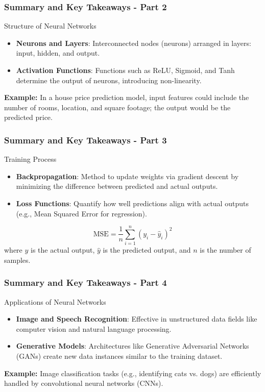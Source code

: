 \documentclass[aspectratio=169]{beamer}
\begin{document}
\begin{frame}[fragile]
  \frametitle{Summary and Key Takeaways - Part 2}
  \begin{block}{Structure of Neural Networks}
    \begin{itemize}
      \item \textbf{Neurons and Layers}: Interconnected nodes (neurons) arranged in layers: input, hidden, and output.
      \item \textbf{Activation Functions}: Functions such as ReLU, Sigmoid, and Tanh determine the output of neurons, introducing non-linearity.
    \end{itemize}
    
    \textbf{Example:} In a house price prediction model, input features could include the number of rooms, location, and square footage; the output would be the predicted price.
  \end{block}
\end{frame}

\begin{frame}[fragile]
  \frametitle{Summary and Key Takeaways - Part 3}
  \begin{block}{Training Process}
    \begin{itemize}
      \item \textbf{Backpropagation}: Method to update weights via gradient descent by minimizing the difference between predicted and actual outputs.
      \item \textbf{Loss Functions}: Quantify how well predictions align with actual outputs (e.g., Mean Squared Error for regression).
    \end{itemize}
    
    \begin{equation}
    \text{MSE} = \frac{1}{n} \sum_{i=1}^{n} (y_i - \hat{y}_i)^2
    \end{equation}
    where \(y\) is the actual output, \(\hat{y}\) is the predicted output, and \(n\) is the number of samples.
  \end{block}
\end{frame}

\begin{frame}[fragile]
  \frametitle{Summary and Key Takeaways - Part 4}
  \begin{block}{Applications of Neural Networks}
    \begin{itemize}
      \item \textbf{Image and Speech Recognition}: Effective in unstructured data fields like computer vision and natural language processing.
      \item \textbf{Generative Models}: Architectures like Generative Adversarial Networks (GANs) create new data instances similar to the training dataset.
    \end{itemize}
    
    \textbf{Example:} Image classification tasks (e.g., identifying cats vs. dogs) are efficiently handled by convolutional neural networks (CNNs).
  \end{block}
\end{frame}
\end{document}
